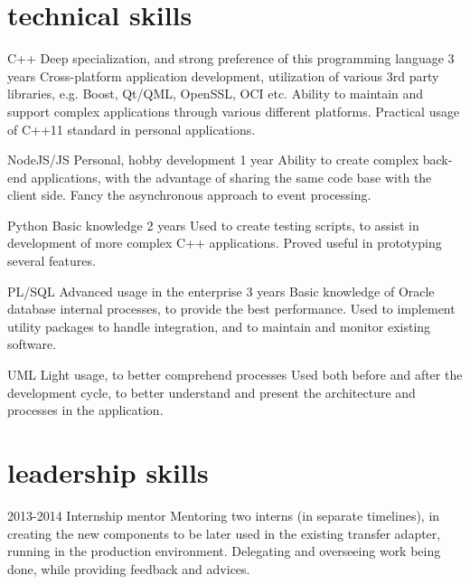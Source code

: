 \documentclass[]{friggeri-cv} %
\begin{document}
\section{technical skills}
\begin{entrylist}
\entry
{C++}
{Deep specialization, and strong preference of this programming language}
{3 years}
{Cross-platform application development, utilization of various 3rd party libraries, e.g. Boost, Qt/QML, OpenSSL, OCI etc. Ability to maintain and support complex applications through various different platforms. Practical usage of C++11 standard in personal applications.}

\entry
{NodeJS/JS}
{Personal, hobby development}
{1 year}
{Ability to create complex back-end applications, with the advantage of sharing the same code base with the client side. Fancy the asynchronous approach to event processing.}

\entry
{Python}
{Basic knowledge}
{2 years}
{Used to create testing scripts, to assist in development of more complex C++ applications. Proved useful in prototyping several features.}

\entry
{PL/SQL}
{Advanced usage in the enterprise}
{3 years}
{Basic knowledge of Oracle database internal processes, to provide the best performance. Used to implement utility packages to handle integration, and to maintain and monitor existing software.}

\entry
{UML}
{Light usage, to better comprehend processes}
{}
{Used both before and after the development cycle, to better understand and present the architecture and processes in the application.}

\end{entrylist}

\newpage


\section{leadership skills}

\begin{entrylist}
\entry
{2013-2014}
{Internship mentor}
{}
{Mentoring two interns (in separate timelines), in creating the new components to be later used in the existing transfer adapter, running in the production environment. Delegating and overseeing work being done, while providing feedback and advices.}

\end{entrylist}
\end{document}
